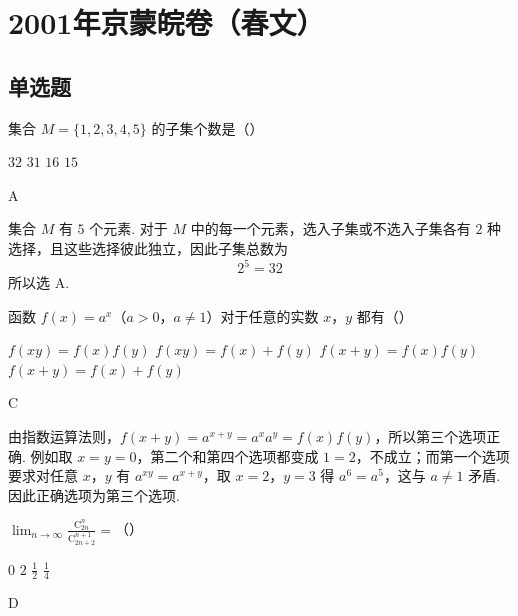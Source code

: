 \chapter{2001年京蒙皖卷（春文）}
\section{单选题}
\begin{problem}
集合 \(M = \{1, 2, 3, 4, 5\}\) 的子集个数是（\quad）

\choices
    {\(32\)}
    {\(31\)}
    {\(16\)}
    {\(15\)}
\end{problem}

\begin{answer}
A
\end{answer}

\begin{solution}
集合 \(M\) 有 \(5\) 个元素. 对于 \(M\) 中的每一个元素，选入子集或不选入子集各有 \(2\) 种选择，且这些选择彼此独立，因此子集总数为
\[
2^5=32
\]
所以选 A.
\end{solution}

\begin{problem}
函数 \(f(x) = a^x\)（\(a > 0\)，\(a \neq 1\)）对于任意的实数 \(x\)，\(y\) 都有（\quad）

\choices
    {\(f(xy) = f(x)f(y)\)}
    {\(f(xy) = f(x) + f(y)\)}
    {\(f(x + y) = f(x)f(y)\)}
    {\(f(x + y) = f(x) + f(y)\)}
\end{problem}

\begin{answer}
C
\end{answer}

\begin{solution}
由指数运算法则，\(f(x+y)=a^{x+y}=a^x a^y=f(x)f(y)\)，所以第三个选项正确. 例如取 \(x=y=0\)，第二个和第四个选项都变成 \(1=2\)，不成立；而第一个选项要求对任意 \(x\)，\(y\) 有 \(a^{xy}=a^{x+y}\)，取 \(x=2\)，\(y=3\) 得 \(a^6=a^5\)，这与 \(a\neq1\) 矛盾. 因此正确选项为第三个选项.
\end{solution}

\begin{problem}
\(\displaystyle\lim_{n\to\infty}\frac{\mathrm C_{2n}^{n}}{\mathrm C_{2n+2}^{n+1}}=\)（\quad）

\choices
    {\(0\)}
    {\(2\)}
    {\(\frac{1}{2}\)}
    {\(\frac{1}{4}\)}
\end{problem}

\begin{answer}
D
\end{answer}


